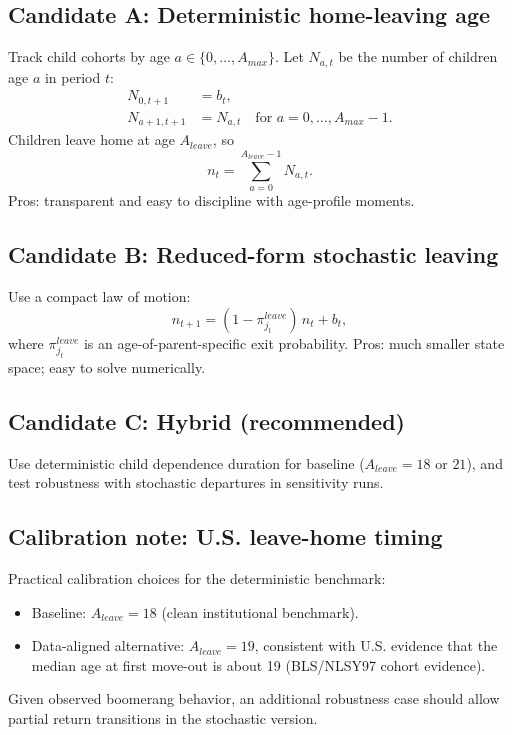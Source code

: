 \documentclass[11pt]{article}
\begin{document}
\subsection*{Candidate A: Deterministic home-leaving age}
Track child cohorts by age \(a \in \{0,\dots,A_{max}\}\). Let \(N_{a,t}\) be the number of children age \(a\) in period \(t\):
\begin{align}
N_{0,t+1} &= b_t, \\
N_{a+1,t+1} &= N_{a,t} \quad \text{for } a=0,\dots,A_{max}-1.
\end{align}
Children leave home at age \(A_{leave}\), so
\begin{equation}
n_t = \sum_{a=0}^{A_{leave}-1} N_{a,t}.
\end{equation}
Pros: transparent and easy to discipline with age-profile moments.

\subsection*{Candidate B: Reduced-form stochastic leaving}
Use a compact law of motion:
\begin{equation}
n_{t+1} = (1-\pi^{leave}_{j_t})\,n_t + b_t,
\end{equation}
where \(\pi^{leave}_{j_t}\) is an age-of-parent-specific exit probability.
Pros: much smaller state space; easy to solve numerically.

\subsection*{Candidate C: Hybrid (recommended)}
Use deterministic child dependence duration for baseline (\(A_{leave}=18\) or \(21\)), and test robustness with stochastic departures in sensitivity runs.

\subsection*{Calibration note: U.S. leave-home timing}
Practical calibration choices for the deterministic benchmark:
\begin{itemize}
\item Baseline: \(A_{leave}=18\) (clean institutional benchmark).
\item Data-aligned alternative: \(A_{leave}=19\), consistent with U.S. evidence that the median age at first move-out is about 19 (BLS/NLSY97 cohort evidence).
\end{itemize}
Given observed boomerang behavior, an additional robustness case should allow partial return transitions in the stochastic version.
\end{document}
